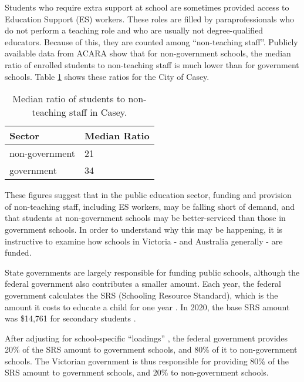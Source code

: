 \documentclass[11pt, a4paper]{article}
\begin{document}
    Students who require extra support at school are sometimes provided access to Education Support (ES) workers. These roles are filled by paraprofessionals who do not perform a teaching role and who are usually not degree-qualified educators. Because of this, they are counted among ``non-teaching staff''. Publicly available data from ACARA \parencite{acara_profiles} show that for non-government schools, the median ratio of enrolled students to non-teaching staff is much lower than for government schools. Table \ref{es_staff_ratios} shows these ratios for the City of Casey.

    \begin{table}[!ht]
        \centering
        \caption{Median ratio of students to non-teaching staff in Casey.}
        \begin{tabular}{|l|l|}
            \hline
            Sector          & Median Ratio  \\ \hline
            non-government  & 21            \\ \hline
            government      & 34            \\ \hline
        \end{tabular}
        \label{es_staff_ratios}
    \end{table}

    These figures suggest that in the public education sector, funding and provision of non-teaching staff, including ES workers, may be falling short of demand, and that students at non-government schools may be better-serviced than those in government schools. In order to understand why this may be happening, it is instructive to examine how schools in Victoria - and Australia generally - are funded.

    State governments are largely responsible for funding public schools, although the federal government also contributes a smaller amount. Each year, the federal government calculates the SRS (Schooling Resource Standard), which is the amount it costs to educate a child for one year \parencite{srs_background}. In 2020, the base SRS amount was \$14,761 for secondary students \parencite{srs_2020}.

    After adjusting for school-specific ``loadings'' \parencite{srs_2020}, the federal government provides 20\% of the SRS amount to government schools, and 80\% of it to non-government schools. The Victorian government is thus responsible for providing 80\% of the SRS amount to government schools, and 20\% to non-government schools. 
\end{document}
